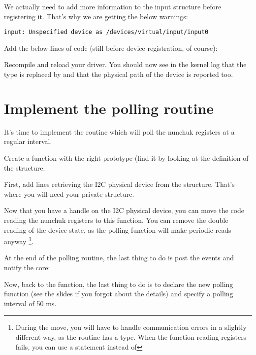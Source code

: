We actually need to add more information to the input structure before
registering it. That's why we are getting the below warnings:

\begin{verbatim}
input: Unspecified device as /devices/virtual/input/input0
\end{verbatim}

Add the below lines of code (still before device registration, of
course):


Recompile and reload your driver. You should now see in the kernel log
that the  type is replaced by
 and that the physical path of the device is reported
too.

\section{Implement the polling routine}

It's time to implement the routine which will poll the nunchuk registers
at a regular interval.

Create a  function with the right prototype (find
it by looking at the definition of the  structure.

First, add lines retrieving the I2C physical device from the
 structure. That's where you will need your
private  structure.

Now that you have a handle on the I2C physical device, you can move the
code reading the nunchuk registers to this function. You can
remove the double reading of the device state, as the polling function
will make periodic reads anyway \footnote{During the move, you will have
to handle communication errors in a slightly different way, as the
 routine has a  type. When the function
reading registers fails, you can use a  statement instead
of }.

At the end of the polling routine, the last thing to do is post the events
and notify the  core:


Now, back to the  function, the last thing to do
is to declare the new polling function (see the slides if you forgot
about the details) and specify a polling interval of 50 ms.

